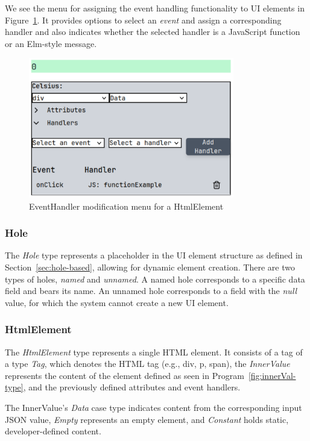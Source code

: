 We see the menu for assigning the event handling functionality to UI elements in Figure~\ref{fig:handler-menu}.
It provides options to select an \emph{event} and assign a corresponding handler and also indicates whether the selected handler is a JavaScript function or an Elm-style message.
\begin{figure}[H]
	\begin{center}
		\includegraphics[width=0.8\textwidth]{img/handler-menu.pdf}
	\end{center}
	\caption{EventHandler modification menu for a HtmlElement}\label{fig:handler-menu}
\end{figure}

\subsubsection{Hole}
The \emph{Hole} type represents a placeholder in the UI element structure as defined in Section~\ref{sec:hole-based}, allowing for dynamic element creation.
There are two types of holes, \emph{named} and \emph{unnamed}.
A named hole corresponds to a specific data field and bears its name.
An unnamed hole corresponds to a field with the \emph{null} value, for which the system cannot create a new UI element.

\subsubsection{HtmlElement}
The \emph{HtmlElement} type represents a single HTML element.
It consists of a tag of a type \emph{Tag}, which denotes the HTML tag (e.g., div, p, span),
the \emph{InnerValue} represents the content of the element defined as seen in Program~\ref{fig:innerVal-type}, and the previously defined attributes and event handlers.

The InnerValue's \emph{Data} case type indicates content from the corresponding input JSON value, \emph{Empty} represents an empty element, and \emph{Constant} holds static, developer-defined content.

